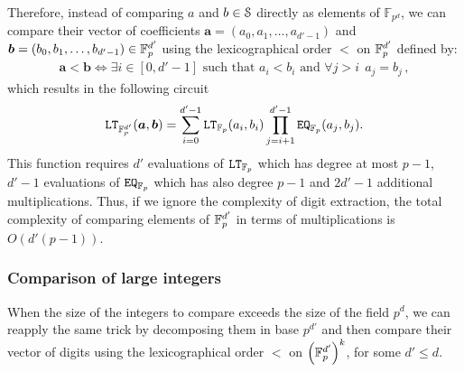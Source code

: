   Therefore, instead of comparing $a$ and $b\in\S$ directly as elements of $\mathbb{F}_{p^d}$, we can compare their vector of coefficients $\bm{a} = (a_0,a_1,\ldots,a_{d'-1})$ and $\bm{b} = (b_0,b_1,\ldots,b_{d'-1}) \in \F_p^{d'}$ using the lexicographical order $\bm{<}$ on $\F_{p}^{d'}$ defined by:
   \begin{align*}
      \bm{a} \bm{<} \bm{b} \Leftrightarrow \exists i\in[0,d'-1] \text{ such that } a_i < b_i \text{ and } \forall j > i ~~ a_j = b_j\,,
    \end{align*}
    which results in the following circuit
    \begin{align*}
      \LT_{\F_p^{d'}}(\bm{a}, \bm{b}) = \sum_{i=0}^{d'-1} \LT_{\F_{p}}(a_{i}, b_{i}) \prod_{j=i+1}^{d'-1} \EQ_{\F_{p}}(a_{j}, b_{j}).
    \end{align*}
  This function requires $d'$ evaluations of $\LT_{\F_{p}}$ which has degree at most $p-1$, $d'-1$ evaluations of $\EQ_{\F_{p}}$ which has also degree $p-1$ and $2d'-1$ additional multiplications.
  Thus, if we ignore the complexity of digit extraction, the total complexity of comparing elements of $\F_{p}^{d'}$ in terms of multiplications is $O(d'(p-1))$.

\subsubsection{Comparison of large integers}
When the size of the integers to compare exceeds the size of the field $p^d$, we can reapply the same trick by decomposing them in base $p^{d'}$ and then compare their vector of digits using the lexicographical order $\bm{<}$ on $\left(\F_{p}^{d'}\right)^k$, for some $d' \le d$.

